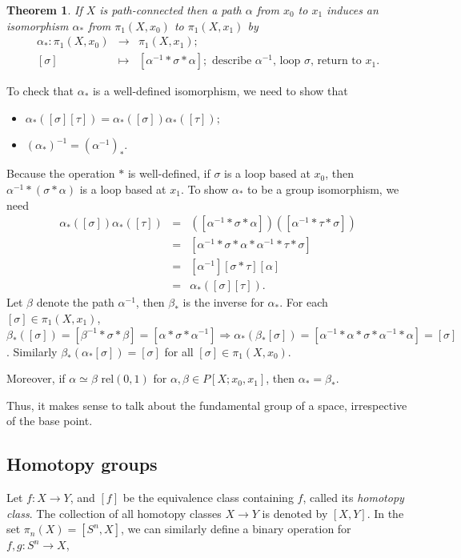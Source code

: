 \documentclass[a4paper,11pt]{article}
\newcommand{\lb}{\left(}
\newcommand{\rb}{\right)}
\newcommand{\ls}{\left[}
\newcommand{\rs}{\right]}
\renewcommand{\t}{\tau}
\renewcommand{\a}{\alpha}
\renewcommand{\b}{\beta}
\newcommand{\s}{\sigma}
\newcommand{\p}{\pi}
\newcommand{\inv}{^{-1}}
\newcommand{\rel}{\text{ rel}}
\newcommand{\tends}{\rightarrow}
\newtheorem{thm}{Theorem}
\begin{document}
\begin{thm}
If $X$ is path-connected then a path $\a$ from $x_0$ to $x_1$ induces an isomorphism $\a_*$ from $\pi_1\lb X, x_0\rb$ to $\pi_1\lb X, x_1\rb$ by
\begin{eqnarray*}
  \a_*:\pi_1\lb X, x_0\rb&\tends&\pi_1\lb X, x_1\rb;\\
   \ls\s\rs&\mapsto&\ls\a\inv *\s *\a\rs;\text{ describe $\a\inv$, loop $\s$, return to $x_1$}.
\end{eqnarray*}
\end{thm}
\noindent{}To check that $\a_*$ is a well-defined isomorphism, we need to show that
\begin{itemize}
  \item[(i)]$\a_*\lb \ls \s\rs\ls\t\rs\rb=\a_*\lb \ls \s\rs\rb\a_*\lb \ls\t\rs\rb;$
  \item[(ii)]$\lb\a_*\rb\inv=\lb\a\inv\rb_*$.
\end{itemize}
Because the operation $*$ is well-defined, if $\s$ is a loop based at $x_0$, then $\a\inv *\lb\s *\a\rb$ is a loop based at $x_1$. To show $\a_*$ to be a group isomorphism, we need
\begin{eqnarray*}
  \a_*\lb \ls \s\rs\rb\a_*\lb \ls\t\rs\rb&=&\lb\ls\a\inv * \s * \a\rs\rb\lb\ls\a\inv * \t * \s\rs\rb\\
  &=&\ls\a\inv * \s * \a *\a\inv * \t * \s\rs\\
  &=&\ls\a\inv\rs\ls\s *\t\rs\ls\a\rs\\
  &=&\a_*\lb \ls \s\rs\ls\t\rs\rb.
\end{eqnarray*}
Let $\b$ denote the path $\a\inv$, then $\b_*$ is the inverse for $\a_*$. For each $\ls\s\rs\in\p_1\lb X, x_1\rb$, $\b_*\lb\ls \s\rs\rb=\ls\b\inv *\s *\b\rs=\ls\a *\s *\a\inv\rs\Rightarrow\a_*\lb\b_*\ls\s\rs\rb=\ls\a\inv * \a *\s *\a\inv *\a\rs=\ls \s\rs$. Similarly $\b_*\lb\a_*\ls \s\rs\rb=\ls \s\rs$ for all $\ls \s\rs\in\p_1\lb X, x_0\rb$.

Moreover, if $\a\simeq\b\rel (0,1)$ for $\a,\b\in P\ls X; x_0, x_1\rs$, then $\a_*=\b_*$.

Thus, it makes sense to talk about the fundamental group of a space, irrespective of the base point.

\subsection{Homotopy groups}
Let $f:X\tends Y$, and $[f]$ be the equivalence class containing $f$, called its \emph{homotopy class}. The collection of all homotopy classes $X\tends Y$ is denoted by $[X,Y]$. In the set $\p_n(X)=\ls S^n, X\rs$, we can similarly define a binary operation for $f,g:S^n\tends X$,
\end{document}
